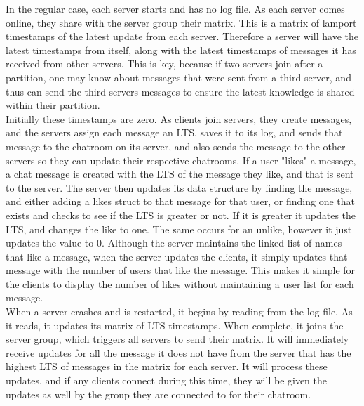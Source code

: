 \documentclass[12pt,journal,compsoc]{IEEEtran}
\begin{document}
In the regular case, each server starts and has no log file.  As each server comes online, they share with the server group their matrix.  This is a matrix of lamport timestamps of the latest update from each server.  Therefore a server will have the latest timestamps from itself, along with the latest timestamps of messages it has received from other servers.  This is key, because if two servers join after a partition, one may know about messages that were sent from a third server, and thus can send the third servers messages to ensure the latest knowledge is shared within their partition.  \\
Initially these timestamps are zero.  As clients join servers, they create messages, and the servers assign each message an LTS, saves it to its log, and sends that message to the chatroom on its server, and also sends the message to the other servers so they can update their respective chatrooms.  If a user "likes" a message, a chat message is created with the LTS of the message they like, and that is sent to the server.  The server then updates its data structure by finding the message, and either adding a likes struct to that message for that user, or finding one that exists and checks to see if the LTS is greater or not.  If it is greater it updates the LTS, and changes the like to one.  The same occurs for an unlike, however it just updates the value to 0.  Although the server maintains the linked list of names that like a message, when the server updates the clients, it simply updates that message with the number of users that like the message.  This makes it simple for the clients to display the number of likes without maintaining a user list for each message.\\
When a server crashes and is restarted, it begins by reading from the log file.  As it reads, it updates its matrix of LTS timestamps.  When complete, it joins the server group, which triggers all servers to send their matrix.  It will immediately receive updates for all the message it does not have from the server that has the highest LTS of messages in the matrix for each server.  It will process these updates, and if any clients connect during this time, they will be given the updates as well by the group they are connected to for their chatroom.
\end{document}
